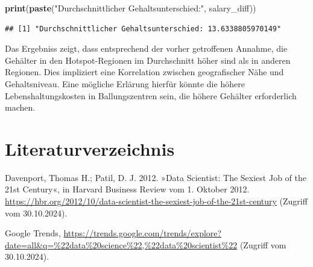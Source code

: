 \documentclass[
]{article}
\newenvironment{Shaded}{\begin{snugshade}}{\end{snugshade}}
\newcommand{\FunctionTok}[1]{\textcolor[rgb]{0.13,0.29,0.53}{\textbf{#1}}}
\newcommand{\NormalTok}[1]{#1}
\newcommand{\StringTok}[1]{\textcolor[rgb]{0.31,0.60,0.02}{#1}}
\begin{document}
\begin{Shaded}
\begin{Highlighting}[]
\FunctionTok{print}\NormalTok{(}\FunctionTok{paste}\NormalTok{(}\StringTok{"Durchschnittlicher Gehaltsunterschied:"}\NormalTok{, salary\_diff))}
\end{Highlighting}
\end{Shaded}

\begin{verbatim}
## [1] "Durchschnittlicher Gehaltsunterschied: 13.6338805970149"
\end{verbatim}

Das Ergebniss zeigt, dass entsprechend der vorher getroffenen Annahme,
die Gehälter in den Hotspot-Regionen im Durchschnitt höher sind als in
anderen Regionen. Dies impliziert eine Korrelation zwischen
geografischer Nähe und Gehaltsniveau. Eine mögliche Erlärung hierfür
könnte die höhere Lebenshaltungskosten in Ballungszentren sein, die
höhere Gehälter erforderlich machen.

\newpage

\section{Literaturverzeichnis}\label{literaturverzeichnis}

Davenport, Thomas H.; Patil, D. J. 2012. »Data Scientist: The Sexiest
Job of the 21st Century«, in Harvard Business Review vom 1. Oktober
2012.
\url{https://hbr.org/2012/10/data-scientist-the-sexiest-job-of-the-21st-century}
(Zugriff vom 30.10.2024).

Google Trends,
\url{https://trends.google.com/trends/explore?date=all&q=\%22data\%20science\%22,\%22data\%20scientist\%22}
(Zugriff vom 30.10.2024).


\end{document}
